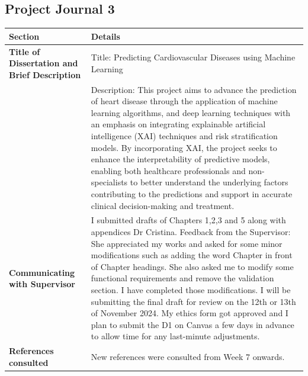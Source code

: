 \subsection{Project Journal 3}
\begin{longtable}{|p{4cm}|p{11cm}|}
\hline
\textbf{Section} & \textbf{Details} \\
\hline
\textbf{Title of Dissertation and Brief Description} & 
Title: Predicting Cardiovascular Diseases using Machine Learning \\
& Description: This project aims to advance the prediction of heart disease through the application of machine learning algorithms, and deep learning techniques with an emphasis on integrating explainable artificial intelligence (XAI) techniques and risk stratification models. By incorporating XAI, the project seeks to enhance the interpretability of predictive models, enabling both healthcare professionals and non-specialists to better understand the underlying factors contributing to the predictions and support in accurate clinical decision-making and treatment.\\
\hline
\textbf{Communicating with Supervisor} & 
I submitted drafts of Chapters 1,2,3 and 5 along with appendices Dr Cristina. 
Feedback from the Supervisor: She appreciated my works and asked for some minor modifications such as adding the word Chapter in front of Chapter headings. She also asked me to modify some functional requirements and remove the validation section. I have completed those modifications. 
I will be submitting the final draft for review on the 12th or 13th of November 2024. My ethics form got approved and I plan to submit the D1 on Canvas a few days in advance to allow time for any last-minute adjustments.
 \\
\hline
\textbf{References consulted} &
New references were consulted from Week 7 onwards.


\end{longtable}

